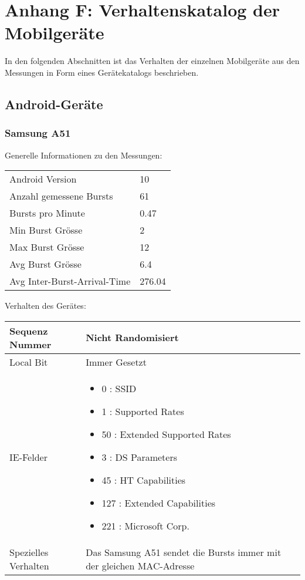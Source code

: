 \chapter{Anhang F: Verhaltenskatalog der Mobilgeräte}
In den folgenden Abschnitten ist das Verhalten der einzelnen Mobilgeräte 
aus den Messungen in Form eines Gerätekatalogs beschrieben.

\clearpage 
\section*{Android-Geräte}
\subsection*{Samsung A51}
Generelle Informationen zu den Messungen:

\begin{table}[h!]
    \begin{tabularx}{\textwidth}{l X }
        \toprule
        Android Version & 10 \\
        Anzahl gemessene Bursts & 61 \\
        Bursts pro Minute & 0.47 \\
        Min Burst Grösse & 2 \\
        Max Burst Grösse & 12 \\
        Avg Burst Grösse & 6.4 \\
        Avg Inter-Burst-Arrival-Time & 276.04 \\
        \bottomrule
    \end{tabularx}
\end{table}

Verhalten des Gerätes:

\begin{table}[h!]
    \begin{tabularx}{\textwidth}{l X }
        \toprule
        Sequenz Nummer & Nicht Randomisiert \\
        \midrule
        Local Bit & Immer Gesetzt \\
        \midrule
        IE-Felder & \begin{itemize}
            \item 0 : SSID
            \item 1 : Supported Rates
            \item 50 : Extended Supported Rates
            \item 3 : DS Parameters
            \item 45 : HT Capabilities
            \item 127 : Extended Capabilities
            \item 221 : Microsoft Corp.
        \end{itemize} \\
        \midrule
        Spezielles Verhalten & Das Samsung A51 sendet die Bursts immer mit der gleichen MAC-Adresse \\
        \bottomrule
    \end{tabularx}
\end{table}
\clearpage


